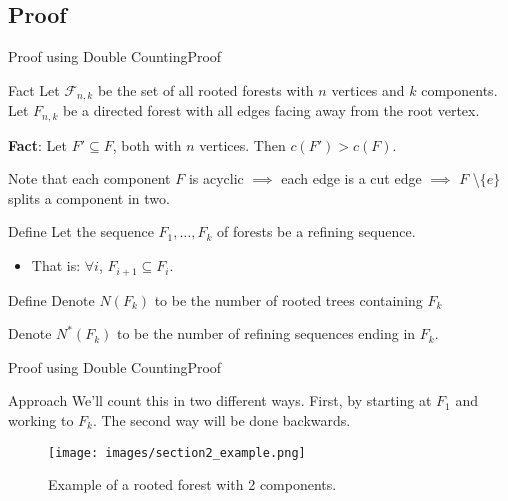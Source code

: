 \documentclass[10pt]{beamer}
\theoremstyle{definition}
\newcommand{\Stwo}{Proof using Double Counting}
\newcommand{\StwoSSproof}{Proof}
\begin{document}
\subsection{\StwoSSproof}
\begin{frame}{\Stwo}{\StwoSSproof}
\begin{block}{Fact}
Let $\mathcal{F}_{n,k}$ be the set of all rooted forests with $n$ vertices and $k$ components. Let $F_{n,k}$ be a directed forest with all edges facing away from the root vertex.

\textbf{Fact}: Let $F'\subseteq F$, both with $n$ vertices. Then $c(F')>c(F)$. 

Note that each component $F$ is acyclic $\implies$ each edge is a cut edge $\implies$ $F$ \textbackslash $\{e\}$ splits a component in two.
\end{block}

\pause

\begin{block}{Define}
Let the sequence $F_{1},\ldots, F_{k}$ of forests be a refining sequence. 
\begin{itemize}
  \item That is: $\forall i$, $F_{i+1}\subseteq F_{i}$.
\end{itemize}
\end{block}

\pause

\begin{block}{Define}
Denote $N(F_{k})$ to be the number of rooted trees containing $F_{k}$

Denote $N^{*}(F_{k})$ to be the number of refining sequences ending in $F_{k}$.
\end{block}

\end{frame}

\begin{frame}{\Stwo}{\StwoSSproof}

\begin{block}{Approach}
We'll count this in two different ways. First, by starting at $F_{1}$ and working to $F_{k}$. The second way will be done backwards.
\end{block}

\pause

\begin{figure}
  \texttt{[image: images/section2\_example.png]}
  \caption{Example of a rooted forest with 2 components.}
  \label{fig:section2_example2}
\end{figure}

\end{frame}
\end{document}
